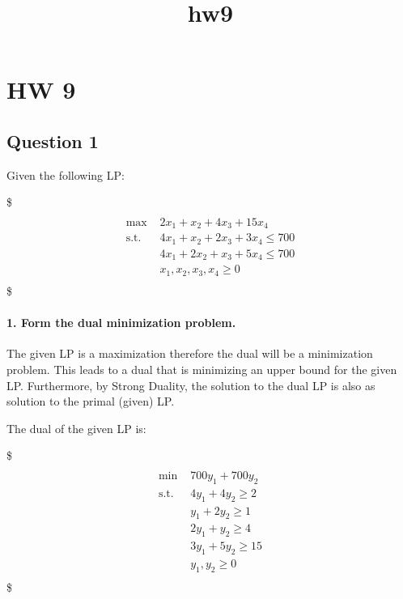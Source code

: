 \documentclass[11pt]{article}
\title{hw9}
\begin{document}
    
    
    \maketitle
    
    

    
    \hypertarget{hw-9}{%
\section{HW 9}\label{hw-9}}

    \hypertarget{question-1}{%
\subsection{Question 1}\label{question-1}}

Given the following LP:

\$ \begin{align} \\
\text{max } &  2x_1 + x_2 + 4x_3 + 15x_4 \\
\text{s.t. } & 4x_1 + x_2 + 2x_3 + 3x_4 \le 700 \\
& 4x_1 + 2x_2 + x_3 + 5x_4 \le 700 \\
& x_1, x_2, x_3, x_4 \ge 0 \\
\end{align} \$

\hypertarget{form-the-dual-minimization-problem.}{%
\paragraph{1. Form the dual minimization
problem.}\label{form-the-dual-minimization-problem.}}

The given LP is a maximization therefore the dual will be a minimization
problem. This leads to a dual that is minimizing an upper bound for the
given LP. Furthermore, by Strong Duality, the solution to the dual LP is
also as solution to the primal (given) LP.

The dual of the given LP is:

\$ \begin{align} \\
\text{min } &  700y_1 + 700y_2 \\
\text{s.t. } & 4y_1 + 4y_2 \ge 2 \\
& y_1 + 2y_2 \ge 1 \\
& 2y_1 + y_2 \ge 4 \\
& 3y_1 + 5y_2 \ge 15 \\
& y_1, y_2 \ge 0 \\
\end{align} \$
\end{document}
